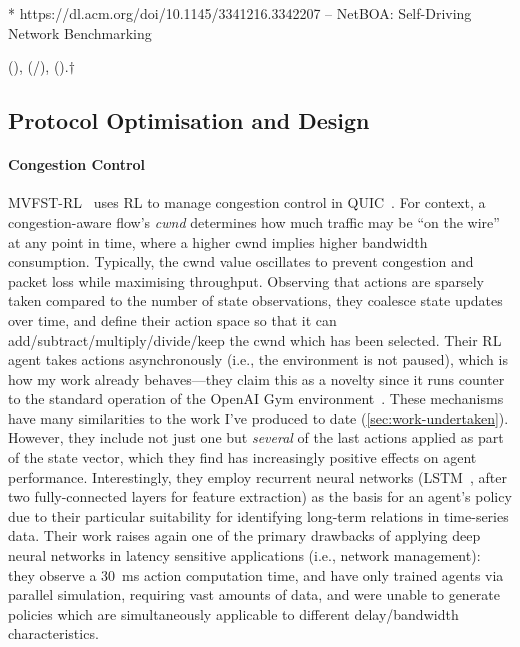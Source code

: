 * https://dl.acm.org/doi/10.1145/3341216.3342207 -- NetBOA: Self-Driving Network Benchmarking

(\rllitstate), (\rllitact/\rllitactreal), (\rllitreward).$\dagger$

\subsection{Protocol Optimisation and Design}

\paragraph{Congestion Control}
MVFST-RL~\cite{DBLP:journals/corr/abs-1910-04054} uses RL to manage congestion control in QUIC~\cite{DBLP:conf/sigcomm/LangleyRWVKZYKS17}.
For context, a congestion-aware flow's \emph{cwnd} determines how much traffic may be ``on the wire'' at any point in time, where a higher cwnd implies higher bandwidth consumption.
Typically, the cwnd value oscillates to prevent congestion and packet loss while maximising throughput.
Observing that actions are sparsely taken compared to the number of state observations, they coalesce state updates over time, and define their action space so that it can add/subtract/multiply/divide/keep the cwnd which has been selected.
Their RL agent takes actions asynchronously (i.e., the environment is not paused), which is how my work already behaves---they claim this as a novelty since it runs counter to the standard operation of the OpenAI Gym environment~\cite{DBLP:journals/corr/BrockmanCPSSTZ16}.
These mechanisms have many similarities to the work I've produced to date (\cref{sec:work-undertaken}).
However, they include not just one but \emph{several} of the last actions applied as part of the state vector, which they find has increasingly positive effects on agent performance.
Interestingly, they employ recurrent neural networks (LSTM~\cite{DBLP:journals/neco/HochreiterS97}, after two fully-connected layers for feature extraction) as the basis for an agent's policy due to their particular suitability for identifying long-term relations in time-series data.
Their work raises again one of the primary drawbacks of applying deep neural networks in latency sensitive applications (i.e., network management): they observe a \SI{30}{\milli\second} action computation time, and have only trained agents via parallel simulation, requiring vast amounts of data, and were unable to generate policies which are simultaneously applicable to different delay/bandwidth characteristics.

